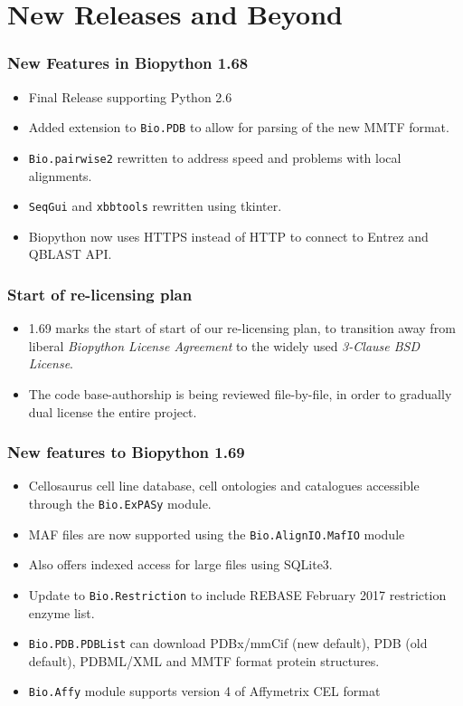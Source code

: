 \documentclass[trans]{beamer}
\begin{document}

\section{New Releases and Beyond}
\frame
{
}
\frame
{
  \frametitle{New Features in Biopython 1.68}

  \begin{itemize}
  \item Final Release supporting Python 2.6
  \item Added extension to \texttt{Bio.PDB} to allow for parsing of the new MMTF format.
  \item \texttt{Bio.pairwise2} rewritten to address speed and problems with local alignments.
  \item \texttt{SeqGui} and \texttt{xbbtools} rewritten using tkinter.
  \item Biopython now uses HTTPS instead of HTTP to connect to Entrez and QBLAST API.
  \end{itemize}

}
\frame
{
}
\frame
{
  \frametitle{Start of re-licensing plan}

  \begin{itemize}
  \item 1.69 marks the start of start of our re-licensing plan, to transition away
from liberal \emph{Biopython License Agreement} to the widely used \emph{3-Clause BSD License}.
\item The code base-authorship is being reviewed file-by-file, in order to gradually dual license the entire
project.
  \end{itemize}

}
\frame
{
  \frametitle{New features to Biopython 1.69}
  \begin{itemize}
  \item Cellosaurus cell line database, cell ontologies and catalogues accessible through the \texttt{Bio.ExPASy} module.
  \item MAF files are now supported using the \texttt{Bio.AlignIO.MafIO} module
  \item Also offers indexed access for large files using SQLite3.
  \item Update to \texttt{Bio.Restriction} to include REBASE February 2017 restriction enzyme list.
  \item \texttt{Bio.PDB.PDBList} can download PDBx/mmCif (new default), PDB (old default), PDBML/XML and MMTF format protein structures.
  \item \texttt{Bio.Affy} module supports version 4 of Affymetrix CEL format
  \end{itemize}

}
\end{document}
